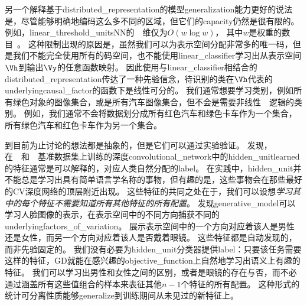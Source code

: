 
另一个解释基于\gls{distributed_representation}的模型\gls{generalization}能力更好的说法是，尽管能够明确地编码这么多不同的区域，但它们的\gls{capacity}仍然是很有限的。
例如，\gls{linear_threshold_units}\gls{NN}的~~维仅为$O(w\log w)$， 其中$w$是权重的数目~\citep{sontag1998vc}。
这种限制出现的原因是，虽然我们可以为表示空间分配非常多的唯一码，但是我们不能完全使用所有的码空间，也不能使用\gls{linear_classifier}学习出从表示空间$\Vh$到输出$\Vy$的任意函数映射。
因此使用与\gls{linear_classifier}相结合的\gls{distributed_representation}传达了一种先验信念，待识别的类在$\Vh$代表的\gls{underlying}\gls{causal_factor}的函数下是线性可分的。
我们通常想要学习类别，例如所有绿色对象的图像集合，或是所有汽车图像集合，但不会是需要非线性~~逻辑的类别。
例如，我们通常不会将数据划分成所有红色汽车和绿色卡车作为一个集合，所有绿色汽车和红色卡车作为另一个集合。


到目前为止讨论的想法都是抽象的，但是它们可以通过实验验证。
\cite{Zhou-et-al-ICLR2015}发现，在~~和~~基准数据集上训练的深度\gls{convolutional_network}中的\gls{hidden_unit}\gls{learned}的特征通常是可以解释的，对应人类自然分配的\gls{label}。
在实践中，\gls{hidden_unit}并不能总是学习出具有简单语言学名称的事物，但有趣的是，这些事物会在那些最好的\gls{CV}深度网络的顶层附近出现。
这些特征的共同之处在于，我们可以设想\emph{学习其中的每个特征不需要知道所有其他特征的所有配置}。
\cite{radford2015unsupervised}发现\gls{generative_model}可以学习人脸图像的表示，在表示空间中的不同方向捕获不同的\gls{underlying}\gls{factors_of_variation}。
展示表示空间中的一个方向对应着该人是男性还是女性，而另一个方向对应着该人是否戴着眼镜。
这些特征都是自动发现的，而非先验固定的。
我们没有必要为\gls{hidden_unit}分类器提供\gls{label}：只要该任务需要这样的特征，\gls{GD}就能在感兴趣的\gls{objective_function}上自然地学习出语义上有趣的特征。
我们可以学习出男性和女性之间的区别，或者是眼镜的存在与否，而不必通过涵盖所有这些值组合的样本来表征其他$n-1$个特征的所有配置。
这种形式的统计可分离性质能够\gls{generalize}到训练期间从未见过的新特征上。



